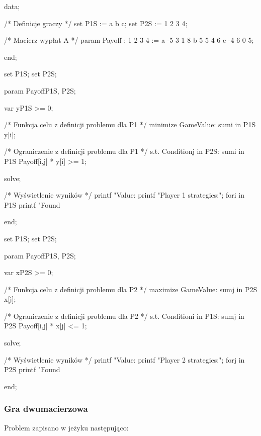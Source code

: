 \documentclass[polish]{standalone}
\begin{document}
\begin{mathprog}[caption=Przykładowe dane]
data;

/* Definicje graczy */
set P1S := a b c;
set P2S := 1 2 3 4;

/* Macierz wypłat A */
param Payoff
    :  1  2  3  4 :=
    a -5  3  1  8
    b  5  5  4  6
    c -4  6  0  5;
 
end;
\end{mathprog}

\begin{mathprog}[caption=Rozwiązanie dla gracza pierwszego]
set P1S;
set P2S;

param Payoff{P1S, P2S};

var y{P1S} >= 0;

/* Funkcja celu z definicji problemu dla P1 */
minimize GameValue: sum{i in P1S} y[i];

/* Ograniczenie z definicji problemu dla P1 */
s.t. Condition{j in P2S}:
    sum{i in P1S} Payoff[i,j] * y[i] >= 1;

solve;

/* Wyświetlenie wyników */
printf "Value: %
printf "Player 1 strategies:\n";
for{i in P1S}
    printf "Found %

end;
\end{mathprog}

\begin{mathprog}[caption=Rozwiązanie dla gracza drugiego]
set P1S;
set P2S;

param Payoff{P1S, P2S};

var x{P2S} >= 0;

/* Funkcja celu z definicji problemu dla P2 */
maximize GameValue: sum{j in P2S} x[j];

/* Ograniczenie z definicji problemu dla P2 */
s.t. Condition{i in P1S}:
    sum{j in P2S} Payoff[i,j] * x[j] <= 1;

solve;

/* Wyświetlenie wyników */
printf "Value: %
printf "Player 2 strategies:\n";
for{j in P2S}
    printf "Found %
 
end;
\end{mathprog}

\subsubsection{Gra dwumacierzowa}

Problem zapisano w jeżyku  następująco:
\end{document}
